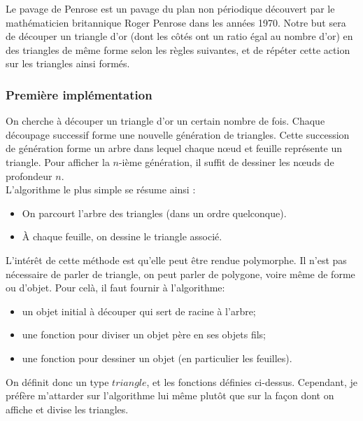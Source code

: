 \documentclass[a4paper,11pt]{article}
\begin{document}
Le pavage de Penrose est un pavage du plan non périodique découvert par le mathématicien
britannique Roger Penrose dans les années 1970.
Notre but sera de découper un triangle d'or (dont les côtés ont un ratio égal au nombre d'or)
en des triangles de même forme selon les règles suivantes,
et de répéter cette action sur les triangles ainsi formés.


\subsubsection{Première implémentation}
\label{sec:algoBasePenrose}
On cherche à découper un triangle d'or un certain nombre de fois. Chaque découpage successif
forme une nouvelle \og génération \fg de triangles. Cette succession de génération forme
un arbre dans lequel chaque nœud et feuille représente un triangle. Pour afficher la
$n$-ième génération, il suffit de dessiner les nœuds de profondeur $n$.\\

L'algorithme le plus simple se résume ainsi :

\begin{itemize}
  \item On parcourt l'arbre des triangles (dans un ordre quelconque).
  \item À chaque feuille, on dessine le triangle associé.\\
\end{itemize}

L'intérêt de cette méthode est qu'elle peut être rendue polymorphe. Il n'est pas nécessaire
de parler de triangle, on peut parler de polygone, voire même de forme ou d'objet.
Pour celà, il faut fournir à l'algorithme:

\begin{itemize}
  \item un objet initial à découper qui sert de racine à l'arbre;
  \item une fonction pour diviser un objet père en ses objets fils;
  \item une fonction pour dessiner un objet (en particulier les feuilles).\\
\end{itemize}

On définit donc un type $triangle$, et les fonctions définies ci-dessus. Cependant,
je préfère m'attarder sur l'algorithme lui même plutôt que sur la façon dont on affiche
et divise les triangles.
\end{document}
